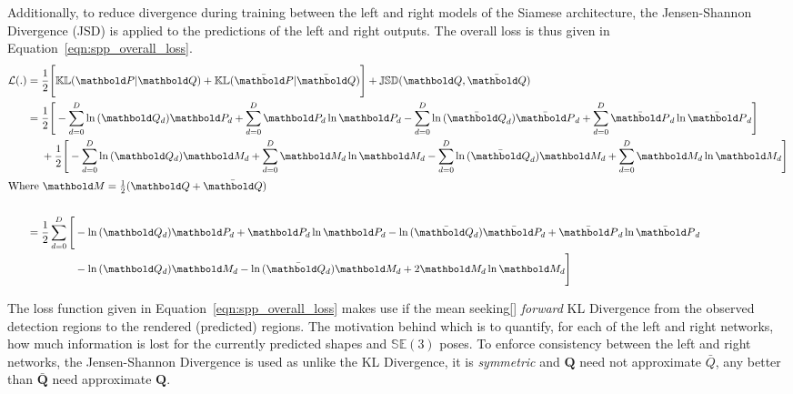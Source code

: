 Additionally, to reduce divergence during training between the left and right models of the Siamese 
architecture, the Jensen-Shannon Divergence (JSD) is applied to the predictions of the left and right outputs.
The overall loss is thus given in Equation~\ref{eqn:spp_overall_loss}.
\begin{align}
  \label{eqn:spp_overall_loss}
  \mathcal{L}(.) &{}= \frac{1}{2} \Bigg[
    \mathbb{KL}(\bm{P} \vert \bm{Q}) + \mathbb{KL}(\bar{\bm{P}} \vert \bar{\bm{Q}})
  \Bigg]
  + \mathbb{JSD}(\bm{Q}, \bar{\bm{Q}})\\
  &{}= 
  \begin{aligned}[t]
    {}& \frac{1}{2} \Bigg[
      -\sum_{d = 0}^{D} \ln{(\bm{Q}_{d})}\bm{P}_{d} + \sum_{d = 0}^{D} \bm{P}_{d}\ln{\bm{P}_{d}}
      -\sum_{d = 0}^{D} \ln{(\bar{\bm{Q}}_{d})}\bar{\bm{P}}_{d} + \sum_{d = 0}^{D} \bar{\bm{P}}_{d}\ln{\bar{\bm{P}}_{d}}
    \Bigg]\\
    {}& + \frac{1}{2} \Bigg[
      -\sum_{d = 0}^{D} \ln{(\bm{Q}_{d})}\bm{M}_{d} + \sum_{d = 0}^{D} \bm{M}_{d}\ln{\bm{M}_{d}}
      -\sum_{d = 0}^{D} \ln{(\bar{\bm{Q}}_{d})}\bm{M}_{d} + \sum_{d = 0}^{D} \bm{M}_{d}\ln{\bm{M}_{d}}
    \Bigg]
  \end{aligned}\\
  \shortintertext{Where \( \bm{M} = \frac{1}{2} (\bm{Q} + \bar{\bm{Q}}) \)}\\
  {}&= \frac{1}{2} \sum_{d = 0}^{D}
    \begin{aligned}[t]
    \Bigg[ {}&
    -\ln{(\bm{Q}_{d})}\bm{P}_{d} + \bm{P}_{d}\ln{\bm{P}_{d}}
    -\ln{(\bar{\bm{Q}_{d}})}\bar{\bm{P}_{d}} + \bar{\bm{P}}_{d}\ln{\bar{\bm{P}}_{d}}\\
    {}& -\ln{(\bm{Q}_{d})}\bm{M}_{d} -\ln{(\bar{\bm{Q}_{d}})}\bm{M}_{d} + 2\bm{M}_{d}\ln{\bm{M}_{d}}
    \Bigg]
    \end{aligned}
\end{align}

The loss function given in Equation~\ref{eqn:spp_overall_loss} makes use if the mean seeking\ref{} 
\textit{forward} KL Divergence from the observed detection regions to the rendered (predicted) 
regions. The motivation behind which is to quantify, for each of the left and right networks, how 
much information is lost for the currently predicted shapes and \( \mathbb{SE}(3) \) poses. To 
enforce consistency between the left and right networks, the Jensen-Shannon Divergence is used as 
unlike the KL Divergence, it is \textit{symmetric} and \( \bm{Q} \) need not approximate \( \bar{Q} \), 
any better than \( \bar{\bm{Q}} \) need approximate \( \bm{Q} \).

